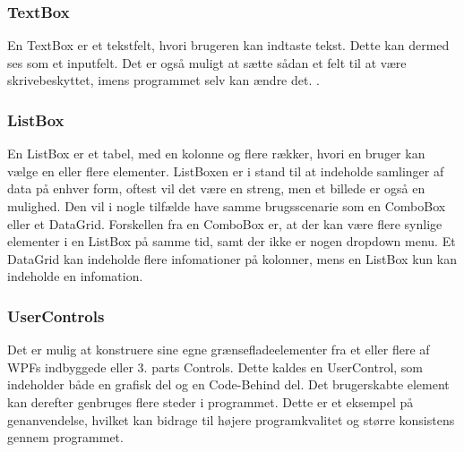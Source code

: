 \subsubsection*{TextBox}
En TextBox er et tekstfelt, hvori brugeren kan indtaste tekst. 
Dette kan dermed ses som et inputfelt. 
Det er også muligt at sætte sådan et felt til at være skrivebeskyttet, imens programmet selv kan ændre det. .

\subsubsection*{ListBox}
En ListBox er et tabel, med en kolonne og flere rækker, hvori en bruger kan vælge en eller flere elementer.
ListBoxen er i stand til at indeholde samlinger af data på enhver form, oftest vil det være en streng, men et billede er også en mulighed.
Den vil i nogle tilfælde have samme brugsscenarie som en ComboBox eller et DataGrid. 
Forskellen fra en ComboBox er, at der kan være flere synlige elementer i en ListBox på samme tid, samt der ikke er nogen dropdown menu.
Et DataGrid kan indeholde flere infomationer på kolonner, mens en ListBox kun kan indeholde en infomation.

\subsubsection*{UserControls}
Det er mulig at konstruere sine egne grænsefladeelementer fra et eller flere af WPFs indbyggede eller 3. parts Controls.
Dette kaldes en UserControl, som indeholder både en grafisk del og en Code-Behind del.
Det brugerskabte element kan derefter genbruges flere steder i programmet.
Dette er et eksempel på genanvendelse, hvilket kan bidrage til højere programkvalitet og større konsistens gennem programmet. 
